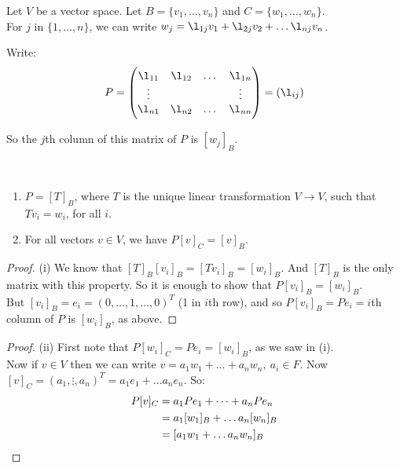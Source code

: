 \documentclass[twoside]{scrartcl}
\begin{document}
 

 Let    
 $V$ be a vector space. Let $B = \{v_1,\dots,v_n\}$ and $C = \{w_1,\dots,w_n\}$. \\
 For $j$ in $\{1, \dots,n\}$, we can write $w_j = \l_{1j}v_1 + \l_{2j}v_2 + \dots \l_{nj}v_n $.
 
 Write:\[
 P =
 \begin{pmatrix}
 \l_{11} & \l_{12} & \dots & \l_{1n}\\
 \vdots & &  & \vdots \\
 \l_{n1} & \l_{n2} & \dots & \l_{nn}
 \end{pmatrix} = (\l_{ij})
 \]
 
 So the $j$th column of this matrix of $P$ is $[w_j]_B$.\\
 
\begin{proposition}~ \begin{enumerate}
 \item[(i)] $P = [T]_B$, where $T$ is the unique linear transformation $V \to V$, such that $Tv_i = w_i$, for all $i$.
 \item[(ii)] For all vectors $v \in V$, we have $P[v]_C = [v]_B$. 
 
 \end{enumerate}
 \end{proposition}

\begin{proof} (i)
We know that $[T]_B[v_i]_B = [Tv_i]_B = [w_i]_B$. And  $[T]_B$ is the only matrix with this property. So it is enough to show that $P[v_i]_B = [w_i]_B$.\\

But $[v_i]_B = e_i = (0,\dots,1,\dots,0)^T$ (1 in $i$th row), and so $P[v_i]_B =  Pe_i = i$th column of $P$ is $[w_i]_B$, as above.
\end{proof}

\begin{proof} (ii)
First note that $P[w_i]_C = Pe_i = [w_i]_B$, as we saw in (i). \\

Now if $v \in V$ then we can write $v = a_1w_1 + \dots + a_nw_n, ~a_i \in F.$ Now $[v]_C = (a_1,\vdots,a_n)^T = a_1e_1 + \dots a_ne_n$. So:
\[
 \begin{aligned}P[v]_C &= a_1Pe_1 + \dots + a_nPe_n\\
 & = a_1[w_1]_B + \dots a_n[w_n]_B \\
 &= [a_1w_1 + \dots a_nw_n]_B\qedhere
 \end{aligned}
\]
\end{proof}\vspace*{10pt}
\end{document}

